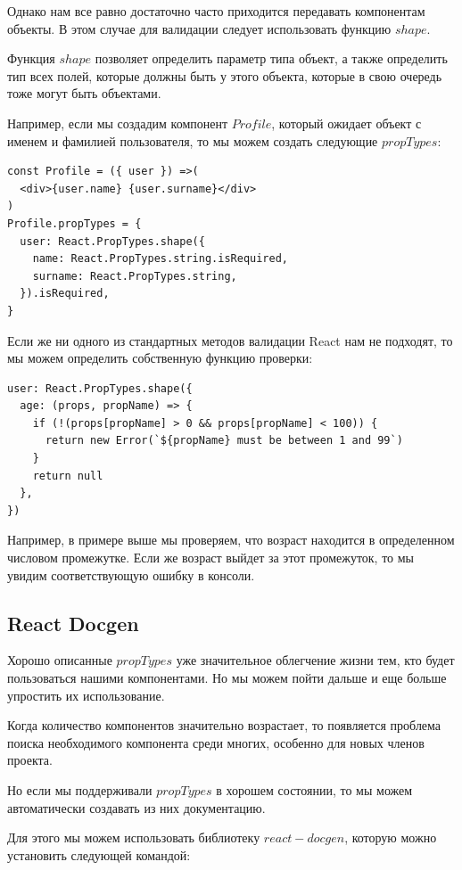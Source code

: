 Однако нам все равно достаточно часто приходится передавать компонентам объекты. В этом случае для валидации следует использовать функцию $shape$.

Функция $shape$ позволяет определить параметр типа объект, а также определить тип всех полей, которые должны быть у этого объекта, которые в свою очередь тоже могут быть объектами.

Например, если мы создадим компонент $Profile$, который ожидает объект с именем и фамилией пользователя, то мы можем создать следующие $propTypes$:

\begin{lstlisting}
const Profile = ({ user }) =>(
  <div>{user.name} {user.surname}</div>
)
Profile.propTypes = {
  user: React.PropTypes.shape({
    name: React.PropTypes.string.isRequired,
    surname: React.PropTypes.string,
  }).isRequired,
}
\end{lstlisting}

Если же ни одного из стандартных методов валидации React нам не подходят, то мы можем определить собственную функцию проверки:

\begin{lstlisting}
user: React.PropTypes.shape({
  age: (props, propName) => {
    if (!(props[propName] > 0 && props[propName] < 100)) {
      return new Error(`${propName} must be between 1 and 99`)
    }
    return null
  },
})
\end{lstlisting}

Например, в примере выше мы проверяем, что возраст находится в определенном числовом промежутке. Если же возраст выйдет за этот промежуток, то мы увидим соответствующую ошибку в консоли.

\subsection{React Docgen}

Хорошо описанные $propTypes$ уже значительное облегчение жизни тем, кто будет пользоваться нашими компонентами. Но мы можем пойти дальше и еще больше упростить их использование.

Когда количество компонентов значительно возрастает, то появляется проблема поиска необходимого компонента среди многих, особенно для новых членов проекта.

Но если мы поддерживали $propTypes$ в хорошем состоянии, то мы можем автоматически создавать из них документацию.

Для этого мы можем использовать библиотеку $react-docgen$, которую можно установить следующей командой:

